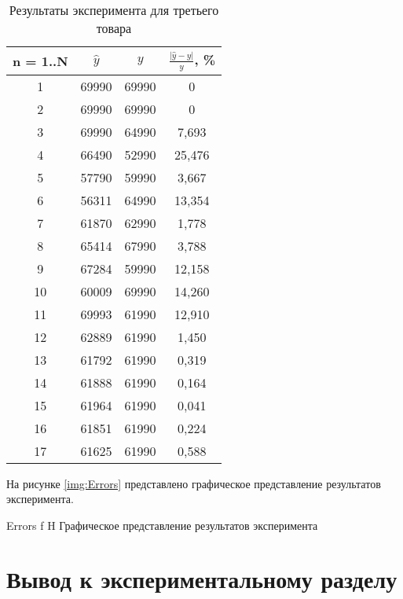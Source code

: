\documentclass{bmstu}
\begin{document}
\begin{table}[H]
	\caption{Результаты эксперимента для третьего товара}
	\begin{center}
		\begin{tabular}{| c | c | c | c |} 
			\hline
			
			\textbf{n = 1..N} & \textbf{$\hat{y}$} & \textbf{$y$} & \textbf{$\frac{|\hat{y} - y|}{y}$, \%} \\  
			
			\hline
			1 & 69990 & 69990 & 0\\
			\hline
			2 & 69990 & 69990 & 0\\
			\hline
			3 & 69990 & 64990 & 7,693\\
			\hline
			4 & 66490 & 52990 & 25,476\\
			\hline
			5 & 57790 & 59990 & 3,667\\
			\hline
			6 & 56311 & 64990 & 13,354\\
			\hline
			7 & 61870 & 62990 & 1,778\\
			\hline
			8 & 65414 & 67990 & 3,788\\
			\hline
			9 & 67284 & 59990 & 12,158\\
			\hline
			10 & 60009 & 69990 & 14,260\\
			\hline
			11 & 69993 & 61990 & 12,910\\
			\hline
			12 & 62889 & 61990 & 1,450\\
			\hline
			13 & 61792 & 61990 & 0,319\\
			\hline
			14 & 61888 & 61990 & 0,164\\
			\hline
			15 & 61964 & 61990 & 0,041\\
			\hline
			16 & 61851 & 61990 & 0,224\\
			\hline
			17 & 61625 & 61990 & 0,588\\
			\hline
		\end{tabular}
	\end{center}
\end{table}

На рисунке \ref{img:Errors} представлено графическое представление результатов эксперимента.
 
{Errors}
{f}
{H}
{\textwidth}
{Графическое представление результатов эксперимента}

\section*{Вывод к экспериментальному разделу}
\end{document}
